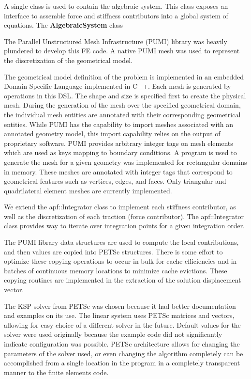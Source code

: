 \documentclass{article}
\begin{document}
A single class is used to contain the algebraic system. This class exposes an interface to assemble force and stiffness contributors into a global system of equations. The \textbf{AlgebraicSystem} class 


The Parallel Unstructured Mesh Infrastructure (PUMI) library was heavily plundered to develop this FE code. A native PUMI mesh was used to represent the discretization of the geometrical model.

The geometrical model definition of the problem is implemented in an embedded Domain Specific Language implemented in C++. Each mesh is generated by operations in this DSL. The shape and size is specified first to create the physical mesh. During the generation of the mesh over the specified geometrical domain, the individual mesh entities are annotated with their corresponding geometrical entities. While PUMI has the capability to import meshes associated with an annotated geometry model, this import capability relies on the output of proprietary software. PUMI provides arbitrary integer tags on mesh elements which are used as keys mapping to boundary conditions. A program is used to generate the mesh for a given geometry was implemented for rectangular domains in memory. These meshes are annotated with integer tags that correspond to geometrical features such as vertices, edges, and faces. Only triangular and quadrilateral element meshes are currently implemented.


We extend the apf::Integrator class to implement each stiffness contributor, as well as the discretization of each traction (force contributor). The apf::Integrator class provides way to iterate over integration points for a given integration order.

The PUMI library data structures are used to compute the local contributions, and then values are copied into PETSc structures. There is some effort to optimize these copying operations to occur in bulk for cache efficiencies and in batches of continuous memory locations to minimize cache evictions. These copying routines are implemented in the extraction of the solution displacement vector.


The KSP solver from PETSc was chosen because it had better documentation and examples on its use. The linear system uses PETSc matrices and vectors, allowing for easy choice of a different solver in the future. Default values for the solver were used originally because the example code did not significantly indicate configuration was possible. PETSc architecture allows for changing the parameters of the solver used, or even changing the algorithm completely can be accomplished from a single location in the program in a completely transparent manner to the finite elements code.
\end{document}
